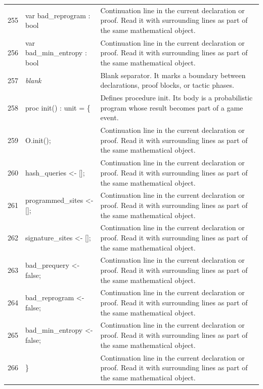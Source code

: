 \documentclass[10pt]{article}
\begin{document}
\begin{longtable}{r L{0.53\textwidth} L{0.37\textwidth}}
255 & {\ttfamily\scriptsize   var bad\_reprogram : bool} & Continuation line in the current declaration or proof.  Read it with surrounding lines as part of the same mathematical object. \\
256 & {\ttfamily\scriptsize   var bad\_min\_entropy : bool} & Continuation line in the current declaration or proof.  Read it with surrounding lines as part of the same mathematical object. \\
257 & {\ttfamily\scriptsize \emph{blank}} & Blank separator.  It marks a boundary between declarations, proof blocks, or tactic phases. \\
258 & {\ttfamily\scriptsize   proc init() : unit = \{} & Defines procedure init.  Its body is a probabilistic program whose result becomes part of a game event. \\
259 & {\ttfamily\scriptsize     O.init();} & Continuation line in the current declaration or proof.  Read it with surrounding lines as part of the same mathematical object. \\
260 & {\ttfamily\scriptsize     hash\_queries <- [];} & Continuation line in the current declaration or proof.  Read it with surrounding lines as part of the same mathematical object. \\
261 & {\ttfamily\scriptsize     programmed\_sites <- [];} & Continuation line in the current declaration or proof.  Read it with surrounding lines as part of the same mathematical object. \\
262 & {\ttfamily\scriptsize     signature\_sites <- [];} & Continuation line in the current declaration or proof.  Read it with surrounding lines as part of the same mathematical object. \\
263 & {\ttfamily\scriptsize     bad\_prequery <- false;} & Continuation line in the current declaration or proof.  Read it with surrounding lines as part of the same mathematical object. \\
264 & {\ttfamily\scriptsize     bad\_reprogram <- false;} & Continuation line in the current declaration or proof.  Read it with surrounding lines as part of the same mathematical object. \\
265 & {\ttfamily\scriptsize     bad\_min\_entropy <- false;} & Continuation line in the current declaration or proof.  Read it with surrounding lines as part of the same mathematical object. \\
266 & {\ttfamily\scriptsize   \}} & Continuation line in the current declaration or proof.  Read it with surrounding lines as part of the same mathematical object. \\

\end{longtable}
\end{document}
